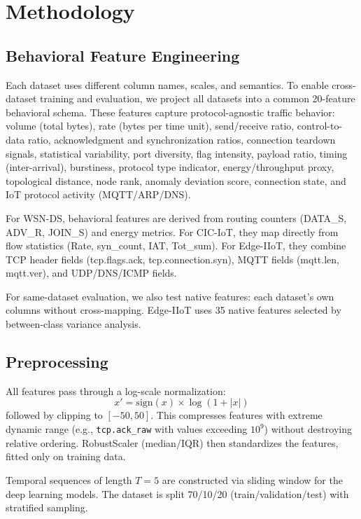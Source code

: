 \documentclass[conference]{IEEEtran}
\begin{document}
\section{Methodology}

\subsection{Behavioral Feature Engineering}

Each dataset uses different column names, scales, and semantics. To enable cross-dataset training and evaluation, we project all datasets into a common 20-feature behavioral schema. These features capture protocol-agnostic traffic behavior: volume (total bytes), rate (bytes per time unit), send/receive ratio, control-to-data ratio, acknowledgment and synchronization ratios, connection teardown signals, statistical variability, port diversity, flag intensity, payload ratio, timing (inter-arrival), burstiness, protocol type indicator, energy/throughput proxy, topological distance, node rank, anomaly deviation score, connection state, and IoT protocol activity (MQTT/ARP/DNS).

For WSN-DS, behavioral features are derived from routing counters (DATA\_S, ADV\_R, JOIN\_S) and energy metrics. For CIC-IoT, they map directly from flow statistics (Rate, syn\_count, IAT, Tot\_sum). For Edge-IIoT, they combine TCP header fields (tcp.flags.ack, tcp.connection.syn), MQTT fields (mqtt.len, mqtt.ver), and UDP/DNS/ICMP fields.

For same-dataset evaluation, we also test native features: each dataset's own columns without cross-mapping. Edge-IIoT uses 35 native features selected by between-class variance analysis.

\subsection{Preprocessing}

All features pass through a log-scale normalization:
\begin{equation}
x' = \text{sign}(x) \times \log(1 + |x|)
\end{equation}
followed by clipping to $[-50, 50]$. This compresses features with extreme dynamic range (e.g., \texttt{tcp.ack\_raw} with values exceeding $10^9$) without destroying relative ordering. RobustScaler (median/IQR) then standardizes the features, fitted only on training data.

Temporal sequences of length $T=5$ are constructed via sliding window for the deep learning models. The dataset is split 70/10/20 (train/validation/test) with stratified sampling.
\end{document}
